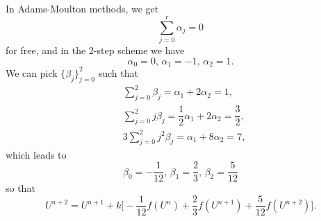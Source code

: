 \documentclass[11pt]{article}
\begin{document}
\maketitle
\pagebreak

\section{}
\subsection{}
In Adams-Moulton methods, we get
\begin{equation}
    \sum_{j=0}^r \alpha_j = 0
\end{equation}
for free, and in the 2-step scheme we have
\begin{equation}
\alpha_0 = 0,\,\alpha_1 = -1,\,\alpha_2 = 1.
\nonumber\end{equation}
We can pick $\{\beta_j\}_{j=0}^2$ such that
\begin{equation}\begin{split}
    &\sum_{j=0}^2\beta_j = \alpha_1 + 2\alpha_2 = 1,\\
    &\sum_{j=0}^2 j\beta_j = \dfrac12\alpha_1+2\alpha_2 = \dfrac32,\\
    &3\sum_{j=0}^2 j^2\beta_j = \alpha_1+ 8\alpha_2 = 7,
\end{split}\end{equation}
which leads to
\begin{equation}
    \beta_0 = -\dfrac1{12},\,\beta_1 = \dfrac23,\,\beta_2 = \dfrac5{12}
\nonumber\end{equation}
so that
\begin{equation}
    U^{n+2} = U^{n+1} + k\Big[-\dfrac1{12} f(U^n) + \dfrac23f(U^{n+1})
        + \dfrac5{12}f(U^{n+2})\Big].
\end{equation}
\end{document}
